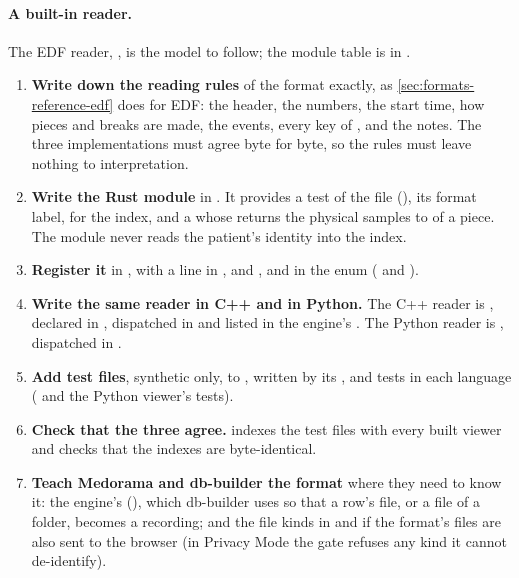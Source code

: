 \paragraph{A built-in reader.} The EDF reader, , is the
model to follow; the module table is in .
\begin{enumerate}
\item \textbf{Write down the reading rules} of the format exactly, as
  \cref{sec:formats-reference-edf} does for EDF: the header, the numbers, the start time, how
  pieces and breaks are made, the events, every key of , and the notes. The three
  implementations must agree byte for byte, so the rules must leave nothing to interpretation.
\item \textbf{Write the Rust module} in . It provides a test of the
  file (), its format label,  for the index, and a  whose  returns the physical
  samples  to  of a piece. The module never reads the patient's identity into
  the index.
\item \textbf{Register it} in , with a line in ,
   and , and in the  enum ( and
  ).
\item \textbf{Write the same reader in C++ and in Python.} The C++ reader is
  , declared in
  , dispatched in  and listed in the engine's
  . The Python reader is ,
  dispatched in .
\item \textbf{Add test files}, synthetic only, to , written by
  its , and tests in each language ( and the Python
  viewer's tests).
\item \textbf{Check that the three agree.}  indexes the test files with every
  built viewer and checks that the indexes are byte-identical.
\item \textbf{Teach Medorama and db-builder the format} where they need to know it: the
  engine's  (), which db-builder uses so that
  a row's file, or a file of a folder, becomes a recording; and the file kinds in
   and  if the format's files are
  also sent to the browser (in Privacy Mode the gate refuses any kind it cannot de-identify).
\end{enumerate}

